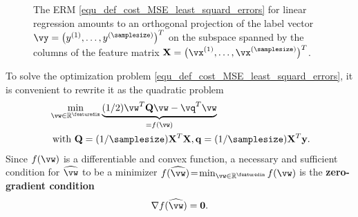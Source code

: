 \documentclass[12pt]{report}
\begin{document}
\begin{figure}
\begin{center}
\end{center}
\caption{The ERM \eqref{equ_def_cost_MSE_least_squard_errors} for linear regression amounts to an orthogonal projection of the label vector $\vy=\big(y^{(1)},\ldots,y^{(\samplesize)}\big)^{T}$ on the subspace spanned by the columns of the 
	feature matrix $\mathbf{X} = \big(\vx^{(1)},\ldots,\vx^{(\samplesize)} \big)^{T}$.}
\end{figure}

To solve the optimization problem \eqref{equ_def_cost_MSE_least_squard_errors}, it is convenient to rewrite it 
as the quadratic problem 
\begin{align}
\label{equ_quadr_form_linreg}
& \min_{\vw \in \mathbb{R}^{\featuredim}} \underbrace{(1/2) \vw^{T} \mathbf{Q} \vw - \vq^{T}  \vw}_{= f(\vw)} \nonumber \\
& \mbox{ with } \mathbf{Q}= (1/\samplesize) \mathbf{X}^{T} \mathbf{X}, \mathbf{q} =(1/\samplesize) \mathbf{X}^{T} \mathbf{y}. 
\end{align} 
Since $f(\vw)$ is a differentiable and convex function, a necessary and sufficient condition for 
$\widehat{\vw}$ to be a minimizer $f(\widehat{\vw})\!=\!\min_{\vw \in \mathbb{R}^{\featuredim}} f(\vw)$ is the 
{\bf zero-gradient condition} \cite[Sec. 4.2.3]{BoydConvexBook}
\begin{equation}
\label{equ_zero_gradient}
 \nabla f(\widehat{\vw}) = \mathbf{0}.
\end{equation} 
\end{document}
